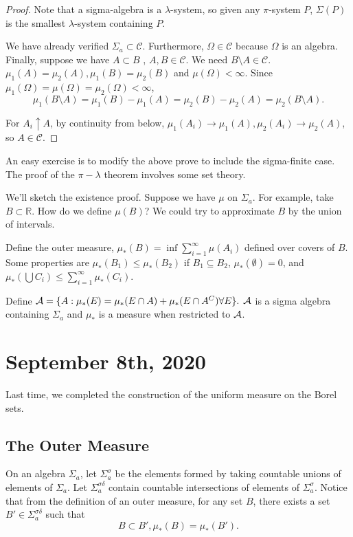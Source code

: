 \documentclass[11pt]{scrartcl}
\newcommand{\R}{\mathbb{R}}
\begin{document}
\begin{proof}
Note that a sigma-algebra is a $\lambda$-system, so given any $\pi$-system $P$, $\Sigma(P)$ is the smallest $\lambda$-system containing $P$.

We have already verified $\Sigma_a \subset \mathscr{C}$. Furthermore, $\Omega \in \mathscr{C}$ because $\Omega$ is an algebra.  Finally, suppose we have $A \subset B$ , $A, B \in \mathscr{C}$.  We need $B \setminus A \in \mathscr{C}$.
$\mu_1(A) = \mu_2(A), \mu_1(B) = \mu_2(B)$ and $\mu(\Omega) < \infty$.  Since $\mu_1(\Omega) = \mu(\Omega) = \mu_2(\Omega) < \infty$,
$$\mu_1(B \setminus A) = \mu_1(B) - \mu_1(A) = \mu_2(B) - \mu_2(A) = \mu_2(B\setminus A).$$

For $A_i \uparrow A$, by continuity from below, $\mu_1(A_i) \rightarrow \mu_1(A), \mu_2(A_i) \rightarrow \mu_2(A)$, so $A \in \mathscr C$.
\end{proof}
An easy exercise is to modify the above prove to include the sigma-finite case.  The proof of the $\pi-\lambda$ theorem involves some set theory.  

We'll sketch the existence proof.  Suppose we have $\mu$ on $\Sigma_a$.  For example, take $B \subset \R$.  How do we define $\mu(B)$?  We could try to approximate $B$ by the union of intervals.

Define the outer measure, $\mu_*(B) = \inf \sum_{i=1}^{\infty}\mu(A_i)$ defined over covers of $B$.  Some properties are $\mu_*(B_1) \le \mu_*(B_2)$ if $B_1 \subseteq B_2$, $\mu_*(\emptyset) = 0$, and $\mu_*(\bigcup C_i) \le \sum_{i=1}^{\infty} \mu_*(C_i)$.

Define $\mathcal A = \{A : \mu_*(E) = \mu_*(E \cap A) + \mu_*(E \cap A^C) \forall E\}.$  $\mathcal A$ is a sigma algebra containing $\Sigma_a$ and $\mu_*$ is a measure when restricted to $\mathcal A$.  
\pagebreak
\section{September 8th, 2020}
Last time, we completed the construction of the uniform measure on the Borel sets.  
\subsection{The Outer Measure}
On an algebra $\Sigma_a$,  let $\Sigma_a^\sigma$ be the elements formed by taking countable unions of elements of $\Sigma_a$.  Let $\Sigma_a^{\sigma \delta}$ contain countable intersections of elements of $\Sigma_a^\sigma$.  Notice that from the definition of an outer measure, for any set $B$, there exists a set $B' \in \Sigma_a^{\sigma \delta}$ such that $$B \subset B', \mu_*(B) = \mu_*(B').$$
\end{document}
